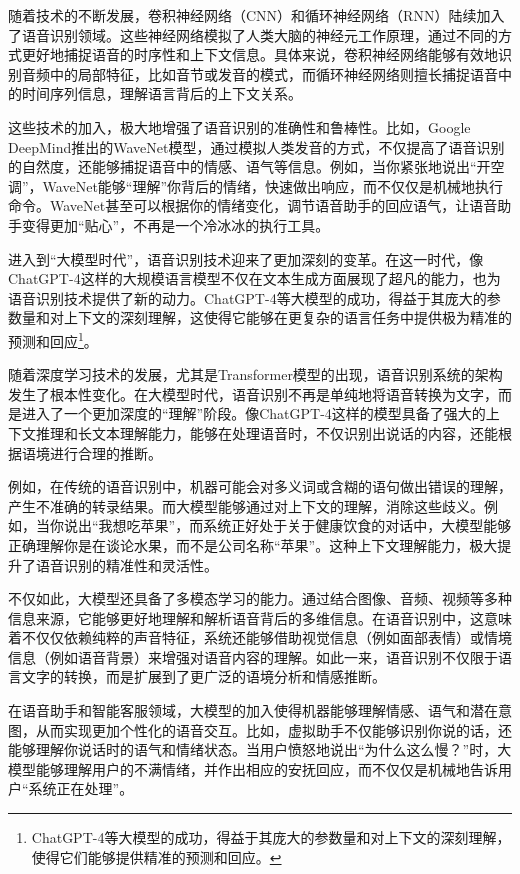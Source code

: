 随着技术的不断发展，卷积神经网络（CNN）和循环神经网络（RNN）陆续加入了语音识别领域。这些神经网络模拟了人类大脑的神经元工作原理，通过不同的方式更好地捕捉语音的时序性和上下文信息。具体来说，卷积神经网络能够有效地识别音频中的局部特征，比如音节或发音的模式，而循环神经网络则擅长捕捉语音中的时间序列信息，理解语言背后的上下文关系。

这些技术的加入，极大地增强了语音识别的准确性和鲁棒性。比如，Google DeepMind推出的WaveNet模型，通过模拟人类发音的方式，不仅提高了语音识别的自然度，还能够捕捉语音中的情感、语气等信息。例如，当你紧张地说出“开空调”，WaveNet能够“理解”你背后的情绪，快速做出响应，而不仅仅是机械地执行命令。WaveNet甚至可以根据你的情绪变化，调节语音助手的回应语气，让语音助手变得更加“贴心”，不再是一个冷冰冰的执行工具。

进入到“大模型时代”，语音识别技术迎来了更加深刻的变革。在这一时代，像ChatGPT-4这样的大规模语言模型不仅在文本生成方面展现了超凡的能力，也为语音识别技术提供了新的动力。ChatGPT-4等大模型的成功，得益于其庞大的参数量和对上下文的深刻理解，这使得它能够在更复杂的语言任务中提供极为精准的预测和回应\footnote{ChatGPT-4等大模型的成功，得益于其庞大的参数量和对上下文的深刻理解，使得它们能够提供精准的预测和回应。}。

随着深度学习技术的发展，尤其是Transformer模型的出现，语音识别系统的架构发生了根本性变化。在大模型时代，语音识别不再是单纯地将语音转换为文字，而是进入了一个更加深度的“理解”阶段。像ChatGPT-4这样的模型具备了强大的上下文推理和长文本理解能力，能够在处理语音时，不仅识别出说话的内容，还能根据语境进行合理的推断。

例如，在传统的语音识别中，机器可能会对多义词或含糊的语句做出错误的理解，产生不准确的转录结果。而大模型能够通过对上下文的理解，消除这些歧义。例如，当你说出“我想吃苹果”，而系统正好处于关于健康饮食的对话中，大模型能够正确理解你是在谈论水果，而不是公司名称“苹果”。这种上下文理解能力，极大提升了语音识别的精准性和灵活性。

不仅如此，大模型还具备了多模态学习的能力。通过结合图像、音频、视频等多种信息来源，它能够更好地理解和解析语音背后的多维信息。在语音识别中，这意味着不仅仅依赖纯粹的声音特征，系统还能够借助视觉信息（例如面部表情）或情境信息（例如语音背景）来增强对语音内容的理解。如此一来，语音识别不仅限于语言文字的转换，而是扩展到了更广泛的语境分析和情感推断。

在语音助手和智能客服领域，大模型的加入使得机器能够理解情感、语气和潜在意图，从而实现更加个性化的语音交互。比如，虚拟助手不仅能够识别你说的话，还能够理解你说话时的语气和情绪状态。当用户愤怒地说出“为什么这么慢？”时，大模型能够理解用户的不满情绪，并作出相应的安抚回应，而不仅仅是机械地告诉用户“系统正在处理”。

